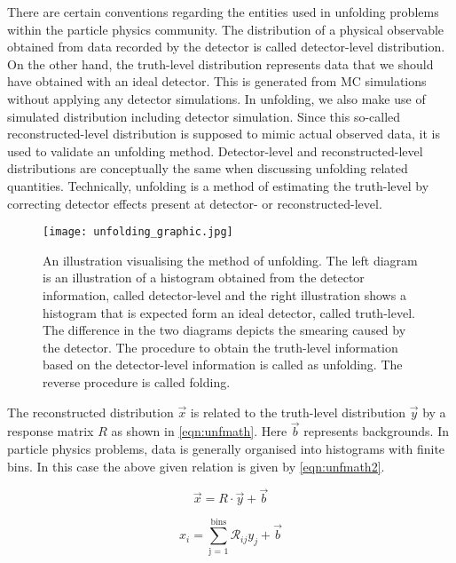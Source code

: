 There are certain conventions regarding the entities used in unfolding problems within the particle physics 
community. The distribution of a physical observable obtained from data recorded by the detector is called detector-level 
distribution. On the other hand, the truth-level distribution represents data that we should
have obtained with an ideal detector. This is generated from MC simulations without applying any detector
simulations. In unfolding, we also make use of simulated distribution including detector simulation.
Since this so-called reconstructed-level distribution is supposed to mimic actual observed data, it is 
used to validate an unfolding method. Detector-level and reconstructed-level distributions are 
conceptually the same when discussing unfolding related quantities. Technically, unfolding
is a method of estimating the truth-level by correcting detector effects present at detector- or
reconstructed-level.

\begin{figure}
    \centering
        \texttt{[image: unfolding\_graphic.jpg]}
        \caption{An illustration visualising the method of unfolding. The left diagram is an illustration
        of a histogram obtained from the detector information, called detector-level and the right 
        illustration shows a histogram that is expected form an ideal detector, called truth-level.
        The difference in the two diagrams depicts the smearing caused by the detector. The procedure to
        obtain the truth-level information based on the detector-level information is called as 
        unfolding. The reverse procedure is called folding.}
           \label{fig:unf_graphic}
  \end{figure}

The reconstructed distribution $\vec{x}$ is related to the truth-level distribution $\vec{y}$ by
a response matrix $R$ as shown in \cref{eqn:unfmath}. Here $\vec{b}$ represents backgrounds. In particle physics problems, data is 
generally organised into histograms with finite bins. In this case the above given relation 
is given by \cref{eqn:unfmath2}.


\begin{equation}
    \vec{x} = R \cdot \vec{y} + \vec{b}
    \label{eqn:unfmath}
\end{equation}

\begin{equation}
    x_i = \sum_{\text{j = 1}}^{\text{bins}} \mathcal{R}_{ij} y_j + \vec{b}
    \label{eqn:unfmath2}
\end{equation}


